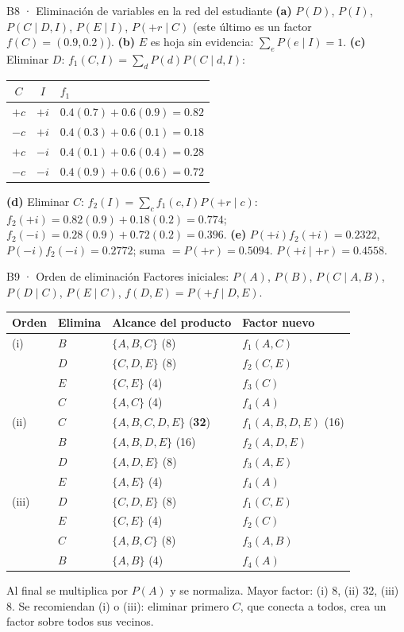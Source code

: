 \begin{solucion}{B8 · Eliminación de variables en la red del estudiante}
\textbf{(a)} $P(D)$, $P(I)$, $P(C\mid D,I)$, $P(E\mid I)$, $P(+r\mid C)$ (este último es un factor $f(C)=(0.9,0.2)$).
\textbf{(b)} $E$ es hoja sin evidencia: $\sum_eP(e\mid I)=1$.
\textbf{(c)} Eliminar $D$: $f_1(C,I)=\sum_dP(d)P(C\mid d,I)$:
\begin{center}\small
\begin{tabular}{cc|l}
$C$ & $I$ & $f_1$\\\hline
$+c$ & $+i$ & $0.4(0.7)+0.6(0.9)=0.82$\\
$-c$ & $+i$ & $0.4(0.3)+0.6(0.1)=0.18$\\
$+c$ & $-i$ & $0.4(0.1)+0.6(0.4)=0.28$\\
$-c$ & $-i$ & $0.4(0.9)+0.6(0.6)=0.72$
\end{tabular}
\end{center}
\textbf{(d)} Eliminar $C$: $f_2(I)=\sum_cf_1(c,I)P(+r\mid c)$: $f_2(+i)=0.82(0.9)+0.18(0.2)=0.774$; $f_2(-i)=0.28(0.9)+0.72(0.2)=0.396$.
\textbf{(e)} $P(+i)f_2(+i)=0.2322$, $P(-i)f_2(-i)=0.2772$; suma $=P(+r)=0.5094$. $P(+i\mid+r)=\mathbf{0.4558}$.
\end{solucion}

\begin{solucion}{B9 · Orden de eliminación}
Factores iniciales: $P(A)$, $P(B)$, $P(C\mid A,B)$, $P(D\mid C)$, $P(E\mid C)$, $f(D,E)=P(+f\mid D,E)$.
\begin{center}\small
\begin{tabular}{l l l l}
\toprule
Orden & Elimina & Alcance del producto & Factor nuevo\\\midrule
(i) & $B$ & $\{A,B,C\}$ (8) & $f_1(A,C)$\\
 & $D$ & $\{C,D,E\}$ (8) & $f_2(C,E)$\\
 & $E$ & $\{C,E\}$ (4) & $f_3(C)$\\
 & $C$ & $\{A,C\}$ (4) & $f_4(A)$\\\midrule
(ii) & $C$ & $\{A,B,C,D,E\}$ (\textbf{32}) & $f_1(A,B,D,E)$ (16)\\
 & $B$ & $\{A,B,D,E\}$ (16) & $f_2(A,D,E)$\\
 & $D$ & $\{A,D,E\}$ (8) & $f_3(A,E)$\\
 & $E$ & $\{A,E\}$ (4) & $f_4(A)$\\\midrule
(iii) & $D$ & $\{C,D,E\}$ (8) & $f_1(C,E)$\\
 & $E$ & $\{C,E\}$ (4) & $f_2(C)$\\
 & $C$ & $\{A,B,C\}$ (8) & $f_3(A,B)$\\
 & $B$ & $\{A,B\}$ (4) & $f_4(A)$\\\bottomrule
\end{tabular}
\end{center}
Al final se multiplica por $P(A)$ y se normaliza. Mayor factor: (i) 8, (ii) 32, (iii) 8. Se recomiendan (i) o (iii): eliminar primero
$C$, que conecta a todos, crea un factor sobre todos sus vecinos.
\end{solucion}


